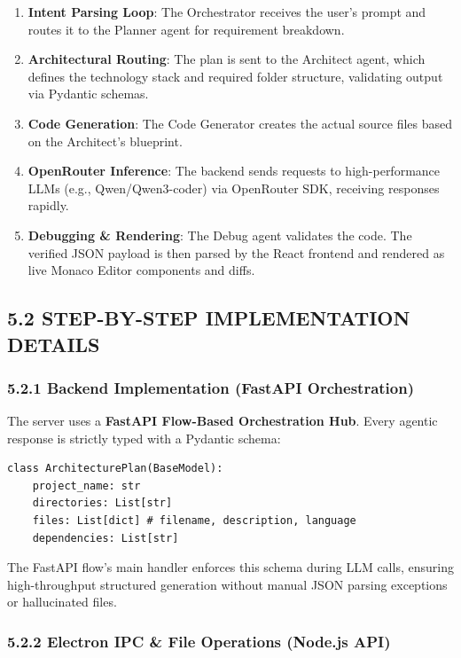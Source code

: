 \documentclass[
  12pt,
]{article}
\providecommand{\tightlist}{%
  \setlength{\itemsep}{0pt}\setlength{\parskip}{0pt}}
\begin{document}
\begin{enumerate}
\def\labelenumi{\arabic{enumi}.}
\tightlist
\item
  \textbf{Intent Parsing Loop}: The Orchestrator receives the user's
  prompt and routes it to the Planner agent for requirement breakdown.
\item
  \textbf{Architectural Routing}: The plan is sent to the Architect
  agent, which defines the technology stack and required folder
  structure, validating output via Pydantic schemas.
\item
  \textbf{Code Generation}: The Code Generator creates the actual source
  files based on the Architect's blueprint.
\item
  \textbf{OpenRouter Inference}: The backend sends requests to
  high-performance LLMs (e.g., Qwen/Qwen3-coder) via OpenRouter SDK,
  receiving responses rapidly.
\item
  \textbf{Debugging \& Rendering}: The Debug agent validates the code.
  The verified JSON payload is then parsed by the React frontend and
  rendered as live Monaco Editor components and diffs.
\end{enumerate}

\subsection{5.2 STEP-BY-STEP IMPLEMENTATION
DETAILS}\label{step-by-step-implementation-details}

\subsubsection{5.2.1 Backend Implementation (FastAPI
Orchestration)}\label{backend-implementation-fastapi-orchestration}

The server uses a \textbf{FastAPI Flow-Based Orchestration Hub}. Every
agentic response is strictly typed with a Pydantic schema:

\begin{verbatim}
class ArchitecturePlan(BaseModel):
    project_name: str
    directories: List[str]
    files: List[dict] # filename, description, language
    dependencies: List[str]
\end{verbatim}

The FastAPI flow's main handler enforces this schema during LLM calls,
ensuring high-throughput structured generation without manual JSON
parsing exceptions or hallucinated files.

\subsubsection{5.2.2 Electron IPC \& File Operations (Node.js
API)}\label{electron-ipc-file-operations-node.js-api}
\end{document}
